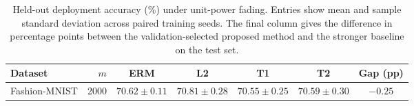 \begin{table}[htb]
\centering
\caption{Held-out deployment accuracy (\%) under unit-power fading. Entries show mean and sample standard deviation across paired training seeds. The final column gives the difference in percentage points between the validation-selected proposed method and the stronger baseline on the test set.}
\label{tab:unit-power-sweep}
\begin{tabular}{lrccccc}
\toprule
Dataset & $m$ & ERM & L2 & T1 & T2 & Gap (pp) \\
\midrule
Fashion-MNIST & 2000 & $70.62\pm0.11$ & $\mathbf{70.81}\pm0.28$ & $70.55\pm0.25$ & $70.59\pm0.30$ & $-0.25$ \\
\bottomrule
\end{tabular}
\end{table}
